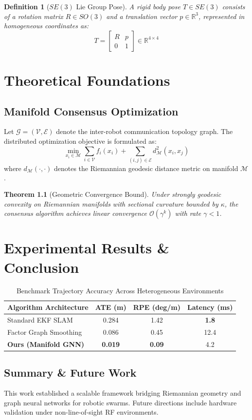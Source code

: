 \documentclass[11pt,a4paper,oneside]{report}
\newtheorem{theorem}{Theorem}[chapter]
\newtheorem{definition}{Definition}[chapter]
\begin{document}
\begin{definition}[$SE(3)$ Lie Group Pose]
A rigid body pose $T \in SE(3)$ consists of a rotation matrix $R \in SO(3)$ and a translation vector $p \in \mathbb{R}^3$, represented in homogeneous coordinates as:
\begin{equation}
T = \begin{bmatrix} R & p \\ 0 & 1 \end{bmatrix} \in \mathbb{R}^{4 \times 4}
\end{equation}
\end{definition}

\chapter{Theoretical Foundations}
\section{Manifold Consensus Optimization}
Let $\mathcal{G} = (\mathcal{V}, \mathcal{E})$ denote the inter-robot communication topology graph. The distributed optimization objective is formulated as:
\begin{equation}
\min_{x_i \in \mathcal{M}} \sum_{i \in \mathcal{V}} f_i(x_i) + \sum_{(i, j) \in \mathcal{E}} d_{\mathcal{M}}^2(x_i, x_j)
\end{equation}
where $d_{\mathcal{M}}(\cdot, \cdot)$ denotes the Riemannian geodesic distance metric on manifold $\mathcal{M}$.

\begin{theorem}[Geometric Convergence Bound]
Under strongly geodesic convexity on Riemannian manifolds with sectional curvature bounded by $\kappa$, the consensus algorithm achieves linear convergence $\mathcal{O}(\gamma^k)$ with rate $\gamma < 1$.
\end{theorem}

\chapter{Experimental Results \& Conclusion}
\begin{table}[h!]
\centering
\caption{Benchmark Trajectory Accuracy Across Heterogeneous Environments}
\begin{tabular}{lccc}
\toprule
\textbf{Algorithm Architecture} & \textbf{ATE (m)} & \textbf{RPE (deg/m)} & \textbf{Latency (ms)} \\
\midrule
Standard EKF SLAM               & 0.284 & 1.42 & \textbf{1.8} \\
Factor Graph Smoothing          & 0.086 & 0.45 & 12.4 \\
\textbf{Ours (Manifold GNN)}    & \textbf{0.019} & \textbf{0.09} & 4.2 \\
\bottomrule
\end{tabular}
\end{table}

\section{Summary \& Future Work}
This work established a scalable framework bridging Riemannian geometry and graph neural networks for robotic swarms. Future directions include hardware validation under non-line-of-sight RF environments.
\end{document}
